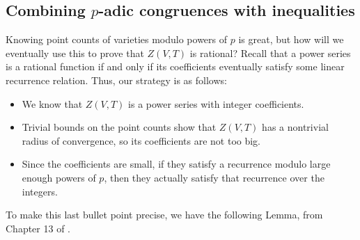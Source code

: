 \documentclass[letterpaper,11pt]{article}
\begin{document}
\subsection{Combining $p$-adic congruences with inequalities}

Knowing point counts of varieties modulo powers of $p$ is great, but how will we eventually use this to prove that $Z(V,T)$ is rational? Recall that a power series is a rational function if and only if its coefficients eventually satisfy some linear recurrence relation. Thus, our strategy is as follows:
\begin{itemize}
\item We know that $Z(V,T)$ is a power series with integer coefficients.
\item Trivial bounds on the point counts show that $Z(V,T)$ has a nontrivial radius of convergence, so its coefficients are not too big.
\item Since the coefficients are small, if they satisfy a recurrence modulo large enough powers of $p$, then they actually satisfy that recurrence over the integers.
\end{itemize}

To make this last bullet point precise, we have the following Lemma, from Chapter 13 of \cite{local-fields}.
\end{document}
